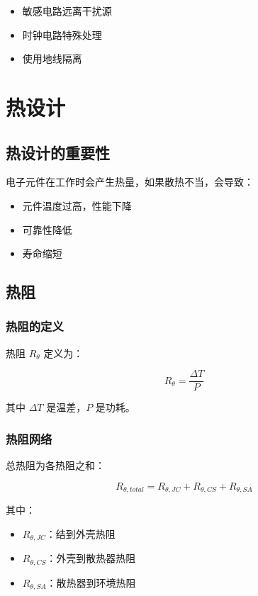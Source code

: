 \begin{itemize}
  \item 敏感电路远离干扰源
  \item 时钟电路特殊处理
  \item 使用地线隔离
\end{itemize}

\section{热设计}

\subsection{热设计的重要性}

电子元件在工作时会产生热量，如果散热不当，会导致：
\begin{itemize}
  \item 元件温度过高，性能下降
  \item 可靠性降低
  \item 寿命缩短
\end{itemize}

\subsection{热阻}

\subsubsection{热阻的定义}

热阻 $R_{\theta}$ 定义为：

\begin{equation}
R_{\theta} = \frac{\Delta T}{P} \label{eq:thermal-resistance}
\end{equation}

其中 $\Delta T$ 是温差，$P$ 是功耗。

\subsubsection{热阻网络}

总热阻为各热阻之和：

\begin{equation}
R_{\theta,total} = R_{\theta,JC} + R_{\theta,CS} + R_{\theta,SA} \label{eq:total-thermal-resistance}
\end{equation}

其中：
\begin{itemize}
  \item $R_{\theta,JC}$：结到外壳热阻
  \item $R_{\theta,CS}$：外壳到散热器热阻
  \item $R_{\theta,SA}$：散热器到环境热阻
\end{itemize}

